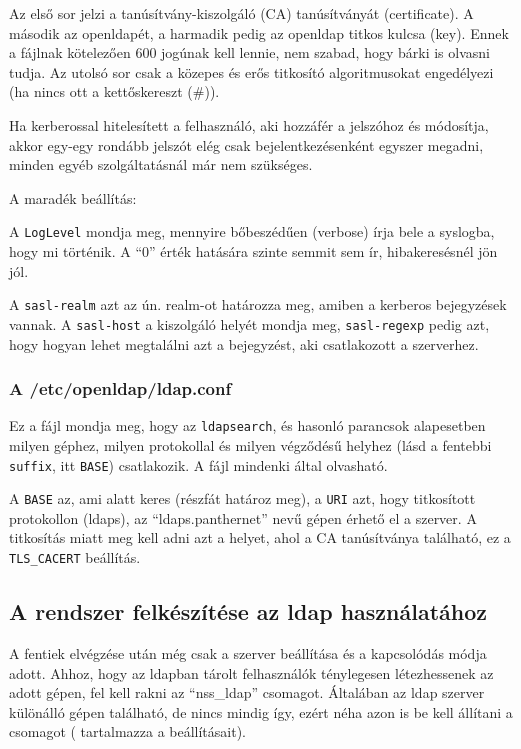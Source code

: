 Az első sor jelzi a tanúsítvány-kiszolgáló (CA) tanúsítványát (certificate). A második az openldapét, a harmadik pedig
az openldap titkos kulcsa (key). Ennek a fájlnak kötelezően 600 jogúnak kell lennie, nem szabad, hogy bárki is olvasni
tudja. Az utolsó sor csak a közepes és erős titkosító algoritmusokat engedélyezi (ha nincs ott a kettőskereszt (\#)).


Ha kerberossal hitelesített a felhasználó, aki hozzáfér a jelszóhoz és módosítja, akkor egy-egy rondább jelszót elég
csak bejelentkezésenként egyszer megadni, minden egyéb szolgáltatásnál már nem szükséges.


A maradék beállítás:


A \texttt{LogLevel} mondja meg, mennyire bőbeszédűen (verbose) írja bele a syslogba, hogy mi történik. A ``0'' érték
hatására szinte semmit sem ír, hibakeresésnél jön jól.

A \texttt{sasl-realm} azt az ún. realm-ot határozza meg, amiben a kerberos bejegyzések vannak. A \texttt{sasl-host} a
kiszolgáló helyét mondja meg, \texttt{sasl-regexp} pedig azt, hogy hogyan lehet megtalálni azt a bejegyzést, aki
csatlakozott a szerverhez.


\subsubsection{A /etc/openldap/ldap.conf}
Ez a fájl mondja meg, hogy az \texttt{ldapsearch}, és hasonló parancsok alapesetben milyen géphez, milyen protokollal
és milyen végződésű helyhez (lásd a fentebbi \texttt{suffix}, itt \texttt{BASE}) csatlakozik. A fájl mindenki által
olvasható.


A \texttt{BASE} az, ami alatt keres (részfát határoz meg), a \texttt{URI} azt, hogy titkosított protokollon (ldaps), az
``ldaps.panthernet'' nevű gépen érhető el a szerver. A titkosítás miatt meg kell adni azt a helyet, ahol a CA
tanúsítványa található, ez a \texttt{TLS\_CACERT} beállítás.

\subsection{A rendszer felkészítése az ldap használatához}
A fentiek elvégzése után még csak a szerver beállítása és a kapcsolódás módja adott. Ahhoz, hogy az ldapban tárolt
felhasználók ténylegesen létezhessenek az adott gépen, fel kell rakni az ``nss\_ldap'' csomagot. Általában az ldap
szerver különálló gépen található, de nincs mindig így, ezért néha azon is be kell állítani a csomagot
( tartalmazza a beállításait).

